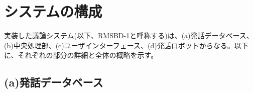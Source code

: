 \documentclass[11pt, a4paper]{jreport} %
\begin{document}







\section{システムの構成}
\label{sec:構成1}
実装した議論システム(以下、RMSBD-1と呼称する)は、(a)発話データベース、(b)中央処理部、(c)ユーザインターフェース、(d)発話ロボットからなる。以下に、それぞれの部分の詳細と全体の概略を示す。

\subsection*{(a)発話データベース}
\end{document}
